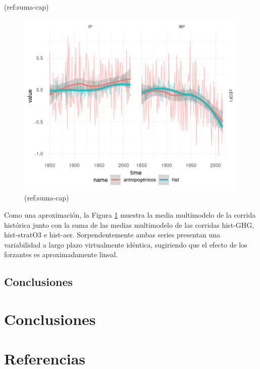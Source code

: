\documentclass[12pt,oneside]{reedthesis}
\begin{document}
(ref:suma-cap)

\begin{figure}
\includegraphics{figures/50-cmip6/suma-1} \caption{(ref:suma-cap)}\label{fig:suma}
\end{figure}

Como una aproximación, la Figura \ref{fig:suma} muestra la media multimodelo de la corrida histórica junto con la suma de las medias multimodelo de las corridas hist-GHG, hist-stratO3 e hist-aer.
Sorpendentemente ambas series presentan una variabilidad a largo plazo virtualmente idéntica, sugiriendo que el efecto de los forzantes es aproximadamente lineal.

\hypertarget{conclusiones-2}{%
\section{Conclusiones}\label{conclusiones-2}}

\hypertarget{conclusiones-3}{%
\chapter{Conclusiones}\label{conclusiones-3}}

\backmatter

\hypertarget{referencias}{%
\chapter*{Referencias}\label{referencias}}

\end{document}
